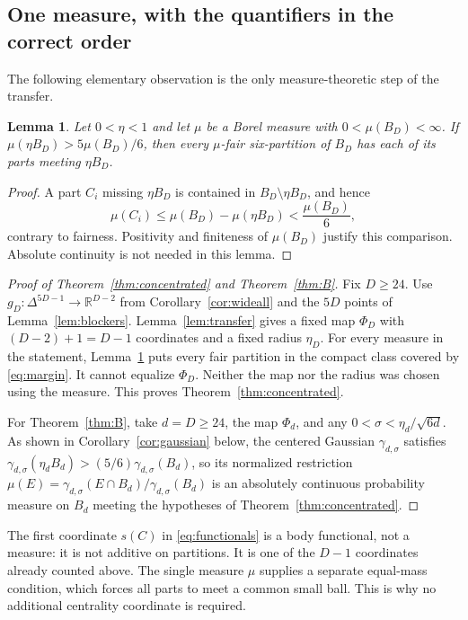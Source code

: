 \documentclass[a4paper,11pt,reqno]{amsart}
\newcommand{\R}{\mathbb R}
\newtheorem{lemma}[theorem]{Lemma}
\theoremstyle{definition}
\theoremstyle{remark}
\numberwithin{equation}{section}
\begin{document}
\subsection{One measure, with the quantifiers in the correct order}
The following elementary observation is the only measure-theoretic
step of the transfer.
\begin{lemma}\label{lem:mass}
Let $0<\eta<1$ and let $\mu$ be a Borel measure with
$0<\mu(B_D)<\infty$. If
$\mu(\eta B_D)>5\mu(B_D)/6$, then every $\mu$-fair six-partition
of $B_D$ has each of its parts meeting $\eta B_D$.
\end{lemma}
\begin{proof}
A part $C_i$ missing $\eta B_D$ is contained in
$B_D\setminus\eta B_D$, and hence
\[
 \mu(C_i)\le\mu(B_D)-\mu(\eta B_D)<\frac{\mu(B_D)}6,
\]
contrary to fairness. Positivity and finiteness of $\mu(B_D)$ justify
this comparison. Absolute continuity is not needed in this lemma.
\end{proof}

\begin{proof}[Proof of Theorem~\ref{thm:concentrated} and Theorem~\ref{thm:B}]
Fix $D\ge24$. Use $g_D:\Delta^{5D-1}\to\R^{D-2}$ from
Corollary~\ref{cor:wideall} and the $5D$ points of
Lemma~\ref{lem:blockers}. Lemma~\ref{lem:transfer} gives a fixed map
$\Phi_D$ with $(D-2)+1=D-1$ coordinates and a fixed radius $\eta_D$.
For every measure in the statement, Lemma~\ref{lem:mass} puts every
fair partition in the compact class covered by \eqref{eq:margin}.
It cannot equalize $\Phi_D$. Neither the map nor the radius was
chosen using the measure. This proves Theorem~\ref{thm:concentrated}.

For Theorem~\ref{thm:B}, take $d=D\ge24$, the map $\Phi_d$, and any
$0<\sigma<\eta_d/\sqrt{6d}$. As shown in Corollary~\ref{cor:gaussian}
below, the centered Gaussian $\gamma_{d,\sigma}$ satisfies
$\gamma_{d,\sigma}(\eta_d B_d)>(5/6)\gamma_{d,\sigma}(B_d)$, so its
normalized restriction $\mu(E)=\gamma_{d,\sigma}(E\cap B_d)/\gamma_{d,\sigma}(B_d)$
is an absolutely continuous probability measure on $B_d$ meeting the
hypotheses of Theorem~\ref{thm:concentrated}.
\end{proof}

The first coordinate $s(C)$ in \eqref{eq:functionals} is a body
functional, not a measure: it is not additive on partitions. It
is one of the $D-1$ coordinates already counted above. The single
measure $\mu$ supplies a separate equal-mass condition, which forces
all parts to meet a common small ball. This is why no additional
centrality coordinate is required.
\end{document}
